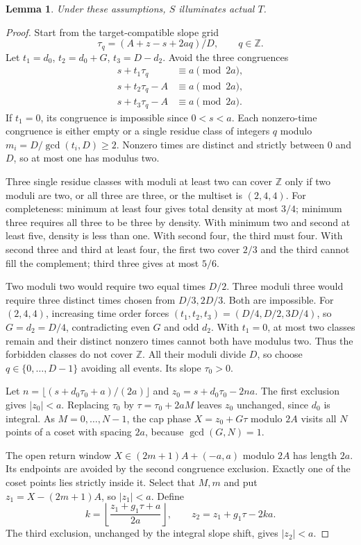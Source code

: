 \documentclass[11pt]{article}
\newtheorem{lemma}[theorem]{Lemma}
\theoremstyle{definition}
\newcommand{\Z}{\mathbb Z}
\begin{document}
\begin{lemma}\label{lem:terminal}
Under these assumptions, $S$ illuminates actual $T$.
\end{lemma}
\begin{proof}
Start from the target-compatible slope grid
\[
 \tau_q=(A+z-s+2aq)/D,\qquad q\in\Z.
\]
Let $t_1=d_0$, $t_2=d_0+G$, $t_3=D-d_2$. Avoid the three congruences
\begin{align*}
 s+t_1\tau_q&\equiv a\pmod{2a},\\
 s+t_2\tau_q-A&\equiv a\pmod{2a},\\
 s+t_3\tau_q-A&\equiv a\pmod{2a}.
\end{align*}
If $t_1=0$, its congruence is impossible since $0<s<a$. Each nonzero-time congruence is either empty or a single residue class of integers $q$ modulo $m_i=D/\gcd(t_i,D)\ge2$. Nonzero times are distinct and strictly between $0$ and $D$, so at most one has modulus two.

Three single residue classes with moduli at least two can cover $\Z$ only if two moduli are two, or all three are three, or the multiset is $(2,4,4)$. For completeness: minimum at least four gives total density at most $3/4$; minimum three requires all three to be three by density. With minimum two and second at least five, density is less than one. With second four, the third must four. With second three and third at least four, the first two cover $2/3$ and the third cannot fill the complement; third three gives at most $5/6$.

Two moduli two would require two equal times $D/2$. Three moduli three would require three distinct times chosen from $D/3,2D/3$. Both are impossible. For $(2,4,4)$, increasing time order forces $(t_1,t_2,t_3)=(D/4,D/2,3D/4)$, so $G=d_2=D/4$, contradicting even $G$ and odd $d_2$. With $t_1=0$, at most two classes remain and their distinct nonzero times cannot both have modulus two. Thus the forbidden classes do not cover $\Z$. All their moduli divide $D$, so choose $q\in\{0,\ldots,D-1\}$ avoiding all events. Its slope $\tau_0>0$.

Let $n=\lfloor(s+d_0\tau_0+a)/(2a)\rfloor$ and $z_0=s+d_0\tau_0-2na$. The first exclusion gives $|z_0|<a$. Replacing $\tau_0$ by $\tau=\tau_0+2aM$ leaves $z_0$ unchanged, since $d_0$ is integral. As $M=0,\ldots,N-1$, the cap phase $X=z_0+G\tau$ modulo $2A$ visits all $N$ points of a coset with spacing $2a$, because $\gcd(G,N)=1$.

The open return window $X\in(2m+1)A+(-a,a)$ modulo $2A$ has length $2a$. Its endpoints are avoided by the second congruence exclusion. Exactly one of the coset points lies strictly inside it. Select that $M,m$ and put $z_1=X-(2m+1)A$, so $|z_1|<a$. Define
\[
 k=\left\lfloor\frac{z_1+g_1\tau+a}{2a}\right\rfloor,\qquad
 z_2=z_1+g_1\tau-2ka.
\]
The third exclusion, unchanged by the integral slope shift, gives $|z_2|<a$.


\end{proof}
\end{document}
